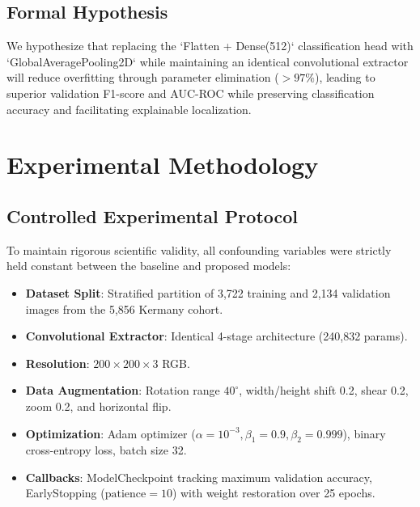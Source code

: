 \documentclass[conference]{IEEEtran}
\begin{document}
\subsection{Formal Hypothesis}
We hypothesize that replacing the `Flatten + Dense(512)` classification head with `GlobalAveragePooling2D` while maintaining an identical convolutional extractor will reduce overfitting through parameter elimination ($>97\%$), leading to superior validation F1-score and AUC-ROC while preserving classification accuracy and facilitating explainable localization.

\section{Experimental Methodology}
\subsection{Controlled Experimental Protocol}
To maintain rigorous scientific validity, all confounding variables were strictly held constant between the baseline and proposed models:
\begin{itemize}
    \item \textbf{Dataset Split}: Stratified partition of 3,722 training and 2,134 validation images from the 5,856 Kermany cohort.
    \item \textbf{Convolutional Extractor}: Identical 4-stage architecture (240,832 params).
    \item \textbf{Resolution}: $200 \times 200 \times 3$ RGB.
    \item \textbf{Data Augmentation}: Rotation range $40^\circ$, width/height shift 0.2, shear 0.2, zoom 0.2, and horizontal flip.
    \item \textbf{Optimization}: Adam optimizer ($\alpha = 10^{-3}, \beta_1 = 0.9, \beta_2 = 0.999$), binary cross-entropy loss, batch size 32.
    \item \textbf{Callbacks}: ModelCheckpoint tracking maximum validation accuracy, EarlyStopping ($\text{patience} = 10$) with weight restoration over 25 epochs.
\end{itemize}
\end{document}
